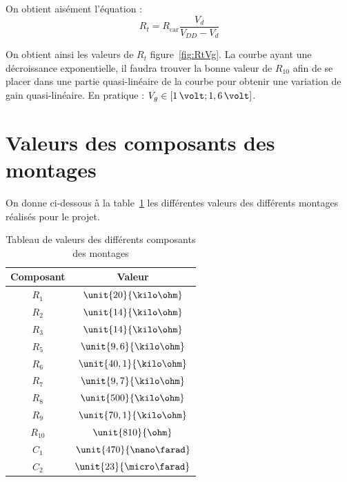 \documentclass[a4paper, 11pt, twocolumn]{article}
\begin{document}
On obtient aisément l'équation :
\[
    R_t = R_\text{car}\frac{V_d}{V_{DD}-V_d}
\]

On obtient ainsi les valeurs de $R_t$ figure~\ref{fig:RtVg}. La courbe ayant une décroissance exponentielle, il faudra trouver la bonne valeur de $R_{10}$ afin de se placer dans une partie quasi-linéaire de la courbe pour obtenir une variation de gain quasi-linéaire. En pratique : $V_g \in \left[ 1\,\volt ; 1,6\,\volt \right]$.

\section*{Valeurs des composants des montages}

On donne ci-dessous à la table~\ref{tab:valeurs} les différentes valeurs des différents montages réalisés pour le projet.

\begin{table}[H]
    \centering
    \begin{tabular}{|c|c|}
    \hline
    Composant &  Valeur\\
    \hline\hline
    $R_1$ & $\unit{20}{\kilo\ohm}$\\
    \hline
    $R_2$ & $\unit{14}{\kilo\ohm}$\\
    \hline
    $R_3$ & $\unit{14}{\kilo\ohm}$\\
    \hline
    $R_5$ & $\unit{9,6}{\kilo\ohm}$\\
    \hline
    $R_6$ & $\unit{40,1}{\kilo\ohm}$\\
    \hline
    $R_7$ & $\unit{9,7}{\kilo\ohm}$\\
    \hline
    $R_8$ & $\unit{500}{\kilo\ohm}$\\
    \hline
    $R_9$ & $\unit{70,1}{\kilo\ohm}$\\
    \hline
    $R_{10}$ & $\unit{810}{\ohm}$\\
    \hline
    $C_1$ & $\unit{470}{\nano\farad}$\\
    \hline
    $C_2$ & $\unit{23}{\micro\farad}$\\
    \hline
\end{tabular}
    \caption{Tableau de valeurs des différents composants des montages}
    \label{tab:valeurs}
\end{table}


\end{document}
